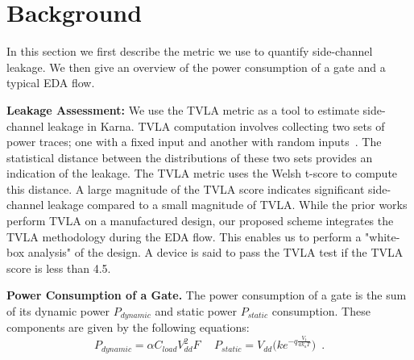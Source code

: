 \section{Background}
\label{sec:background}
In this section we first describe the metric we use to quantify side-channel leakage. We then give an overview of the power consumption of a gate and a typical EDA flow.

{\flushleft \bf Leakage Assessment:}
We use the TVLA metric as a tool to estimate side-channel leakage in {\sf Karna}. TVLA computation involves collecting two sets of power traces; one  with a fixed input and another with random inputs~\cite{becker:2013}. The statistical distance between the distributions of these two sets provides an indication of the leakage. The TVLA metric uses the Welsh t-score to compute this distance. A large magnitude of the TVLA score indicates significant side-channel leakage compared to a small magnitude of TVLA. While the prior works perform TVLA on a manufactured design, our proposed scheme integrates the TVLA methodology during the EDA flow. This enables us to perform a "white-box analysis" of the design. A device is said to pass the TVLA test if the TVLA score is less than 4.5. 









{\flushleft \bf Power Consumption of a Gate.} The  power consumption of a gate is the sum of its dynamic power $P_{dynamic}$ and static power $P_{static}$ consumption. These components are given by the following equations:
\begin{equation*}
P_{dynamic} = \alpha C_{load} V_{dd}^{2} F 
\hspace{15pt}
P_{static} =  V_{dd}\bigg( k e^{-q\frac{V_{t}}{ak_{a}T}}\bigg)\enspace. 
\end{equation*}

